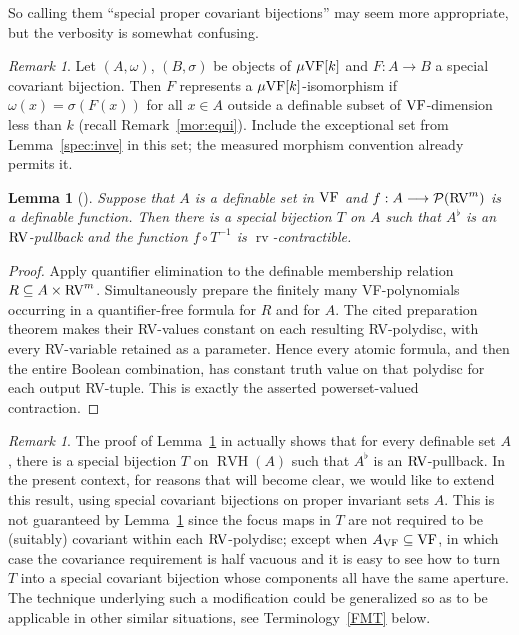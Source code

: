 \documentclass[12pt]{amsart}
\theoremstyle{plain}
\newtheorem{lem}[thm]{Lemma}
\theoremstyle{definition}
\theoremstyle{remark}
\newtheorem{rem}[thm]{Remark}
\numberwithin{equation}{section}
\theoremstyle{plain}
\newcommand{\VF}{\textup{VF}}
\newcommand{\RV}{\textup{RV}}
\newcommand{\0}{\emptyset}
\newcommand{\mdl}[1]{\mathcal{#1}}  %
\newcommand{\fun}{\longrightarrow}
\newcommand{\sub}{\subseteq}
\newcommand{\mgVF}{{\mu} {\VF}}
\DeclareMathOperator{\rv}{rv}
\DeclareMathOperator{\RVH}{RVH}
\begin{document}
So calling them ``special proper covariant bijections'' may seem more appropriate, but the verbosity is somewhat confusing.


\begin{rem}\label{spec:is:iso}
Let $(A,\omega)$, $(B, \sigma)$ be objects of $\mgVF[k]$ and $F : A \fun B$ a special covariant bijection. Then  $F$ represents a $\mgVF[k]$-isomorphism if $\omega(x) = \sigma(F(x))$ for all $x \in A$ outside a definable subset of $\VF$-dimension less than $k$ (recall Remark~\ref{mor:equi}). Include the exceptional set from Lemma~\ref{spec:inve} in this set; the measured morphism convention already permits it.
\end{rem}


\begin{lem}[{\cite[Theorem~5.5]{Yin:special:trans}}]\label{special:bi:term:constant}
Suppose that $A$ is a definable set in $\VF$ and $f : A \fun \mdl P(\RV^m)$ is a definable function. Then there is a special bijection $T$ on $A$ such that $A^\flat$ is an $\RV$-pullback and the function $f \circ T^{-1}$ is $\rv$-contractible.
\end{lem}
\begin{proof}
Apply quantifier elimination to the definable membership relation $R\sub A\times\RV^m$. Simultaneously prepare the finitely many VF-polynomials occurring in a quantifier-free formula for $R$ and for $A$. The cited preparation theorem makes their RV-values constant on each resulting RV-polydisc, with every RV-variable retained as a parameter. Hence every atomic formula, and then the entire Boolean combination, has constant truth value on that polydisc for each output RV-tuple. This is exactly the asserted powerset-valued contraction.
\end{proof}

\begin{rem}\label{special:pseudo}
The proof of Lemma~\ref{special:bi:term:constant} in \cite{Yin:special:trans} actually shows that for every definable set $A$, there is a special bijection $T$ on  $\RVH(A)$  such that $A^{\flat}$ is an $\RV$-pullback. In the present context, for reasons that will become clear, we would like to extend this result, using special covariant bijections  on proper invariant sets $A$. This is not guaranteed by Lemma~\ref{special:bi:term:constant} since the focus maps in $T$ are not required to be (suitably) covariant within each $\RV$-polydisc; except when $A_{\VF} \sub \VF$, in which case  the covariance requirement is half vacuous and it is easy to see how to turn $T$ into a special covariant bijection whose components all have the same aperture. The technique underlying such a modification could be generalized so as to be applicable in other similar situations, see  Terminology~\ref{FMT} below.
\end{rem}
\end{document}
